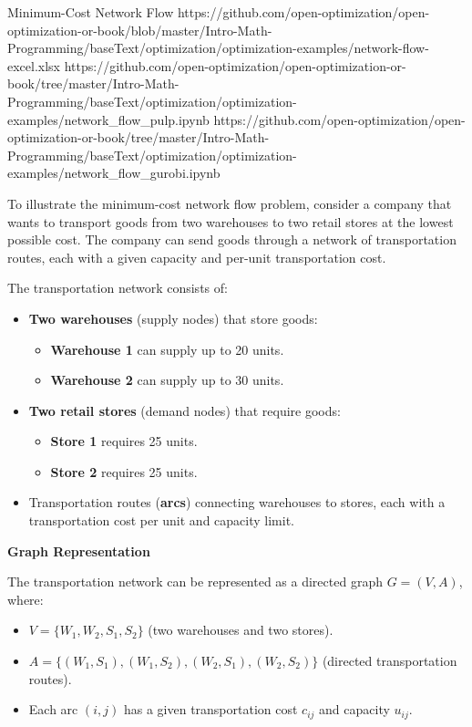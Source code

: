 \begin{examplewithallcode}{Minimum-Cost Network Flow}
{https://github.com/open-optimization/open-optimization-or-book/blob/master/Intro-Math-Programming/baseText/optimization/optimization-examples/network-flow-excel.xlsx}
{https://github.com/open-optimization/open-optimization-or-book/tree/master/Intro-Math-Programming/baseText/optimization/optimization-examples/network_flow_pulp.ipynb}
{https://github.com/open-optimization/open-optimization-or-book/tree/master/Intro-Math-Programming/baseText/optimization/optimization-examples/network_flow_gurobi.ipynb}
\label{ex:min-cost-flow-warehouses}

To illustrate the minimum-cost network flow problem, consider a company that wants to transport goods from two warehouses to two retail stores at the lowest possible cost. The company can send goods through a network of transportation routes, each with a given capacity and per-unit transportation cost.

The transportation network consists of:
\begin{itemize}
    \item \textbf{Two warehouses} (supply nodes) that store goods: 
          \begin{itemize}
              \item \textbf{Warehouse 1} can supply up to 20 units.
              \item \textbf{Warehouse 2} can supply up to 30 units.
          \end{itemize}
    \item \textbf{Two retail stores} (demand nodes) that require goods:
          \begin{itemize}
              \item \textbf{Store 1} requires 25 units.
              \item \textbf{Store 2} requires 25 units.
          \end{itemize}
    \item Transportation routes (\textbf{arcs}) connecting warehouses to stores, each with a transportation cost per unit and capacity limit.
\end{itemize}

\textbf{Graph Representation}

The transportation network can be represented as a directed graph \( G = (V, A) \), where:

\begin{itemize}
    \item \( V = \{ W_1, W_2, S_1, S_2 \} \) (two warehouses and two stores).
    \item \( A = \{(W_1, S_1), (W_1, S_2), (W_2, S_1), (W_2, S_2)\} \) (directed transportation routes).
    \item Each arc \( (i,j) \) has a given transportation cost \( c_{ij} \) and capacity \( u_{ij} \).
\end{itemize}


\end{examplewithallcode}
